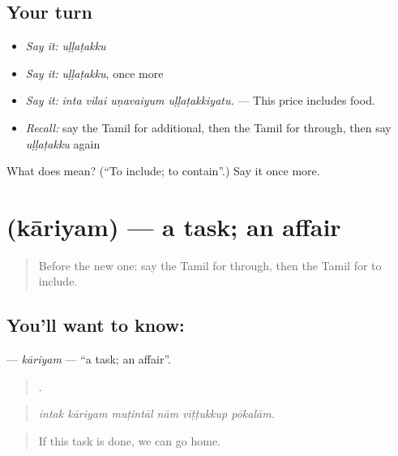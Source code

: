 \subsection*{Your turn}
\begin{itemize}
\raggedright
  \item \emph{Say it:} \emph{uḷḷaṭakku}
  \item \emph{Say it:} \emph{uḷḷaṭakku}, once more
  \item \emph{Say it:} \emph{inta vilai uṇavaiyum uḷḷaṭakkiyatu.} — This price includes food.
  \item \emph{Recall:} say the Tamil for additional, then the Tamil for through, then say \emph{uḷḷaṭakku} again
\end{itemize}

\begin{tcolorbox}[breakable,colback=teal!4,colframe=teal!35!black,title={Before you move on}]
What does  mean? (\textquotedblleft{}To include; to contain\textquotedblright{}.) Say it once more.
\end{tcolorbox}
\section[\texorpdfstring{\ta{காரியம்} (kāriyam)}{காரியம் (kāriyam)}]{ (kāriyam) — a task; an affair}

\label{lesson:TA-C399-kariyam}



\begin{quote}
Before the new one: say the Tamil for through, then the Tamil for to include.
\end{quote}

\subsection*{You'll want to know: }
\textbf{} — \emph{kāriyam} — \textquotedblleft{}a task; an affair\textquotedblright{}.

\begin{quote}
     .
\end{quote}

\begin{quote}
\emph{intak kāriyam muṭintāl nām vīṭṭukkup pōkalām.}
\end{quote}

\begin{quote}
If this task is done, we can go home.
\end{quote}


